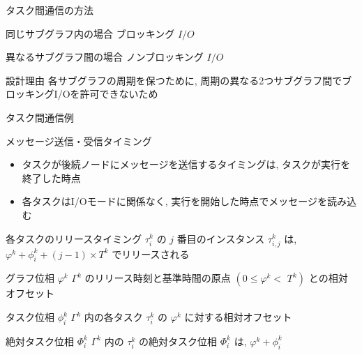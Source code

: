 \begin{frame}{タスク間通信の方法}
    \begin{block}{同じサブグラフ内の場合}
        ブロッキング $I / O$
    \end{block}
    \begin{block}{異なるサブグラフ間の場合}
        ノンブロッキング $I / O$
    \end{block}
    \vspace{5mm}
    \begin{block}{設計理由}
        各サブグラフの周期を保つために, 周期の異なる2つサブグラフ間でブロッキングI/Oを許可できないため
    \end{block}
\end{frame}

\begin{frame}{タスク間通信例}
\end{frame}

\begin{frame}{メッセージ送信・受信タイミング}
    \begin{itemize}
        \item タスクが後続ノードにメッセージを送信するタイミングは, タスクが実行を終了した時点
        \item 各タスクはI/Oモードに関係なく, 実行を開始した時点でメッセージを読み込む
    \end{itemize}
\end{frame}

\begin{frame}{各タスクのリリースタイミング}
    $\tau_i^k$ の $j$ 番目のインスタンス $\tau_{i, j}^{k}$ は, $\varphi^{k}+\phi_{i}^{k}+(j-1) \times T^{k}$ でリリースされる
    \begin{block}{グラフ位相 $\varphi^{k}$}
        $\Gamma^{k}$ のリリース時刻と基準時間の原点 $\left(0 \leq \varphi^{k}<\right.$  $\left.T^{k}\right)$ との相対オフセット
    \end{block}
    \begin{block}{タスク位相 $\phi_{i}^k$}
        $\Gamma^{k}$ 内の各タスク $\tau_{i}^k$ の $\varphi^{k}$ に対する相対オフセット
    \end{block}
    \begin{block}{絶対タスク位相 $\Phi_{i}^{k}$}
        $\Gamma^{k}$ 内の $\tau_{i}^{k}$ の絶対タスク位相 $\Phi_{i}^{k}$ は, $\varphi^{k}+\phi_{i}^{k}$
    \end{block}
\end{frame}

